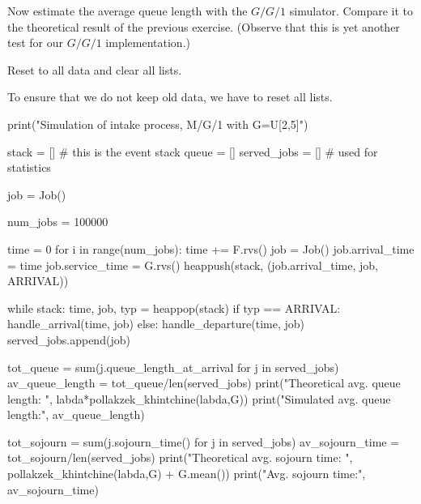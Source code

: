 \documentclass{scrartcl}
\begin{document}
\begin{exercise}
  Now estimate the average queue length with the $G/G/1$ simulator.
  Compare it to the theoretical result of the previous exercise.
  (Observe that this is yet another test for our $G/G/1$ implementation.)

\hintsymbol
  \begin{hint}
Reset to all data and clear all lists. 
  \end{hint}

  \begin{solution}
To ensure that we do not keep old data, we have to reset all lists. 

\begin{pyblock}
print("Simulation of intake process, M/G/1 with G=U[2,5]")


stack = [] # this is the event stack
queue = []
served_jobs = [] # used for statistics

job = Job()

num_jobs = 100000

time = 0
for i in range(num_jobs):
    time += F.rvs()
    job = Job()
    job.arrival_time = time
    job.service_time = G.rvs()
    heappush(stack, (job.arrival_time, job, ARRIVAL))

while stack:
    time, job, typ = heappop(stack)
    if typ == ARRIVAL:
        handle_arrival(time, job)
    else:
        handle_departure(time, job)
        served_jobs.append(job)

tot_queue = sum(j.queue_length_at_arrival for j in served_jobs)
av_queue_length = tot_queue/len(served_jobs)
print("Theoretical avg. queue length: ", labda*pollakzek_khintchine(labda,G))
print("Simulated avg. queue length:", av_queue_length)
      
tot_sojourn = sum(j.sojourn_time() for j in served_jobs)
av_sojourn_time = tot_sojourn/len(served_jobs)
print("Theoretical avg. sojourn time: ", pollakzek_khintchine(labda,G) + G.mean())
print("Avg. sojourn time:", av_sojourn_time)
  
\end{pyblock}

  \end{solution}

\end{exercise}
\end{document}
